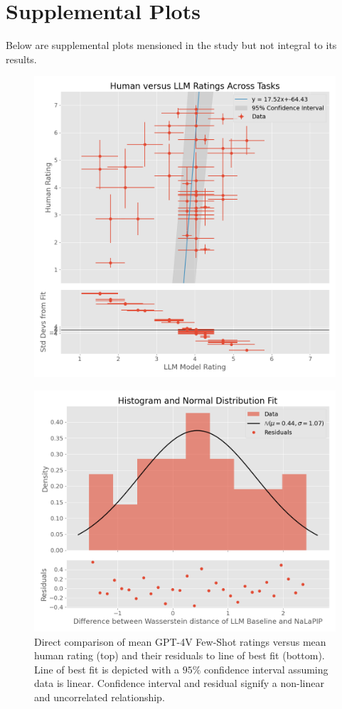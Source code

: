 \documentclass[10pt,letterpaper]{article}
\begin{document}
\newpage
\section{Supplemental Plots}
\label{app:additional_plots}

Below are supplemental plots mensioned in the study but not integral to its results.

\begin{figure}[h]
\hfill
    \parbox{.47\linewidth}{
        \centering
        \includegraphics[scale=0.30]{images/LLM_human_scatter_plot_with_deviations.png}
        \label{fig:violin}
        \caption{Direct comparison of mean GPT-4V Few-Shot ratings versus mean human rating (top) and their residuals to line of best fit (bottom). Line of best fit is depicted with a $95\%$ confidence interval assuming data is linear. Confidence interval and residual signify a non-linear and uncorrelated relationship.}
    }
    \hfill
    \parbox{.47\linewidth}{
        \centering
        \includegraphics[scale=0.35]{images/wasserstein_difference.png}
}
\end{figure}
\end{document}
